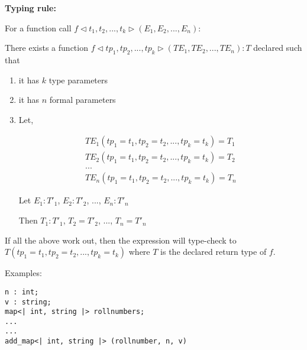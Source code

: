 \documentclass[12pt,a4paper]{report}
\begin{document}
\textbf{Typing rule:}

For a function call $f \triangleleft t_1, t_2, ..., t_k \triangleright(E_1, E_2, ..., E_n)$:

There exists a function $f\triangleleft tp_1, tp_2, ..., tp_k \triangleright(TE_1, TE_2, ..., TE_n) : T$ declared such that 
\begin{enumerate}
\item it has $k$ type parameters
\item it has $n$ formal parameters
\item Let,

\begin{align*}
TE_1(tp_1=t_1, tp_2=t_2, ..., tp_k=t_k) = T_1 \\
TE_2(tp_1=t_1, tp_2=t_2, ..., tp_k=t_k) = T_2 \\
... \\
TE_n(tp_1=t_1, tp_2=t_2, ..., tp_k=t_k) = T_n
\end{align*}

Let $E_1 : T'_1$, $E_2 : T'_2$, ..., $E_n : T'_n$

Then
$T_1 : T'_1$, $T_2 = T'_2$, ..., $T_n = T'_n$
\end{enumerate}

If all the above work out, then the expression will type-check to $T(tp_1=t_1, tp_2=t_2, ..., tp_k=t_k)$ where $T$ is the declared return type of $f$.

Examples:
\begin{lstlisting}
n : int;
v : string;
map<| int, string |> rollnumbers;
...
...
add_map<| int, string |> (rollnumber, n, v)
\end{lstlisting}
\end{document}
